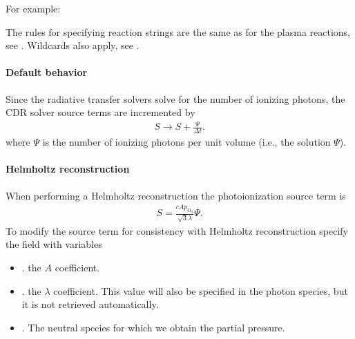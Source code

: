 \documentclass[letterpaper,10pt,english]{sphinxmanual}
\begin{document}
\sphinxAtStartPar
For example:

\begin{sphinxVerbatim}[commandchars=\\\{\},formatcom=\scriptsize]
  \PYG{p}{[}
     
  \PYG{p}{]}
\end{sphinxVerbatim}

\sphinxAtStartPar
The rules for specifying reaction strings are the same as for the plasma reactions, see .
Wildcards also apply, see {\hyperref[\detokenize{Applications/CdrPlasmaModel:cdrplasma-wildcards}]{}}.


\paragraph{Default behavior}
\label{\detokenize{Applications/CdrPlasmaModel:default-behavior}}
\sphinxAtStartPar
Since the radiative transfer solvers solve for the number of ionizing photons, the CDR solver source terms are incremented by
\begin{equation*}
\begin{split}S \rightarrow S + \frac{\Psi}{\Delta t}.\end{split}
\end{equation*}
\sphinxAtStartPar
where \(\Psi\) is the number of ionizing photons per unit volume (i.e., the solution \(\Psi\)).


\paragraph{Helmholtz reconstruction}
\label{\detokenize{Applications/CdrPlasmaModel:helmholtz-reconstruction}}
\sphinxAtStartPar
When performing a Helmholtz reconstruction the photoionization source term is
\begin{equation*}
\begin{split}S = \frac{c A p_{\textrm{O}_2}}{\sqrt{3}\lambda}\Psi.\end{split}
\end{equation*}
\sphinxAtStartPar
To modify the source term for consistency with Helmholtz reconstruction specify the field  with variables
\begin{itemize}
\item {} 
\sphinxAtStartPar
{}. the \(A\) coefficient.

\item {} 
\sphinxAtStartPar
{}. the \(\lambda\) coefficient.
This value will also be specified in the photon species, but it is not retrieved automatically.

\item {} 
\sphinxAtStartPar
{}. The neutral species for which we obtain the partial pressure.

\end{itemize}
\end{document}
